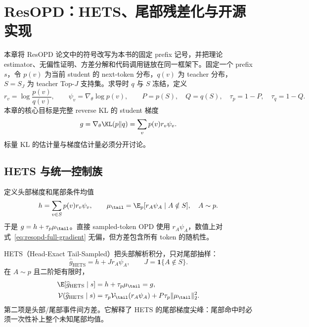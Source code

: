 \chapter{ResOPD：HETS、尾部残差化与开源实现}
\label{ch:resopd}

本章将 ResOPD 论文中的符号改写为本书的固定 prefix 记号，并把理论 estimator、无偏性证明、方差分解和代码调用链放在同一框架下。固定一个 prefix $s$，令
$p(v)$ 为当前 student 的 next-token 分布，$q(v)$ 为 teacher 分布，
$S=S_J$ 为 teacher Top-$J$ 支持集。求导时 $q$ 与 $S$ 冻结，定义
\[
r_v=\log\frac{p(v)}{q(v)},\qquad
\psi_v=\nabla_\theta\log p(v),\qquad
P=p(S),\quad Q=q(S),\quad
\tau_p=1-P,\quad \tau_q=1-Q.
\]
本章的核心目标是完整 reverse KL 的 student 梯度
\begin{equation}
g=\nabla_\theta\KL(p\Vert q)=\sum_v p(v)r_v\psi_v.
\label{eq:resopd-full-gradient}
\end{equation}
标量 KL 的估计量与梯度估计量必须分开讨论。

\section{HETS 与统一控制族}

定义头部梯度和尾部条件均值
\[
h=\sum_{v\in S}p(v)r_v\psi_v,
\qquad
\mu_{\tail}=\E_p[r_A\psi_A\mid A\notin S],\quad A\sim p.
\]
于是 $g=h+\tau_p\mu_{\tail}$。直接 sampled-token OPD 使用 $r_A\psi_A$，数值上对式~\eqref{eq:resopd-full-gradient} 无偏，但方差包含所有 token 的随机性。

HETS（Head-Exact Tail-Sampled）把头部解析积分，只对尾部抽样：
\begin{equation}
\widehat g_{\mathrm{HETS}}=h+Jr_A\psi_A,
\qquad J=\mathbf 1\{A\notin S\}.
\label{eq:resopd-hets}
\end{equation}
在 $A\sim p$ 且二阶矩有限时，
\begin{align}
\E[\widehat g_{\mathrm{HETS}}\mid s]&=h+\tau_p\mu_{\tail}=g,\\
\mathcal V(\widehat g_{\mathrm{HETS}}\mid s)
 &=\tau_p\mathcal V_{\tail}(r_A\psi_A)+P\tau_p\lVert\mu_{\tail}\rVert_2^2.
\label{eq:resopd-hets-var}
\end{align}
第二项是头部/尾部事件间方差。它解释了 HETS 的尾部梯度尖峰：尾部命中时必须一次性补上整个未知尾部均值。

